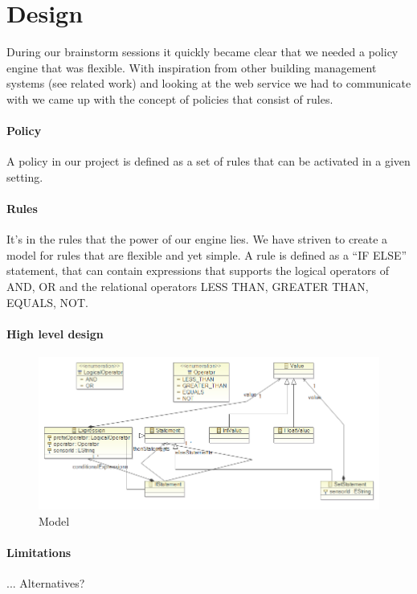 \section{Design}
During our brainstorm sessions it quickly became clear that we needed a policy engine that was flexible. With inspiration from other building management systems (see related work) and looking at the web service we had to communicate with we came up with the concept of policies that consist of rules.

\paragraph{Policy}
A policy in our project is defined as a set of rules that can be activated in a given setting.

\paragraph{Rules}
It's in the rules that the power of our engine lies. We have striven to create a model for rules that are flexible and yet simple. A rule is defined as a "`IF ELSE"' statement, that can contain expressions that supports the logical operators of AND, OR and the relational operators LESS THAN, GREATER THAN, EQUALS, NOT. 

\paragraph{High level design}

\begin{figure}[t]
\includegraphics[width=1.00\columnwidth]{model.png}
\caption{Model}
\end{figure}


\paragraph{Limitations}
... Alternatives?